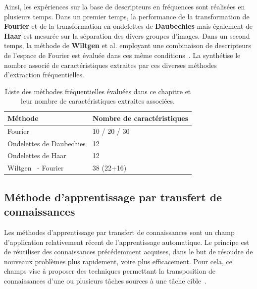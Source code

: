 Ainsi, les expériences sur la base de descripteurs en fréquences sont réalisées en plusieurs temps. Dans un premier temps, la performance de la transformation de \textbf{Fourier} et de la transformation en ondelettes de \textbf{Daubechies} mais également de \textbf{Haar} est mesurée sur la séparation des divers groupes d'images. Dans un second temps, la méthode de \textbf{Wiltgen} et al. employant une combinaison de descripteurs de l'espace de Fourier est évaluée dans ces même conditions~\cite{Wiltgen2008}. La  synthétise le nombre associé de caractéristiques extraites par ces diverses méthodes d'extraction fréquentielles.\par

\begin{table}[H]
    \centering
    \begin{tabular}{ll}
        \toprule
        \textbf{Méthode}                        & \textbf{Nombre de caractéristiques}   \\ \hline
        Fourier                                 & 10 / 20 / 30                          \\ \hline
        Ondelettes de Daubechies                & 12                                    \\ \hline
        Ondelettes de Haar                      & 12                                    \\ \hline
        Wiltgen~\cite{Wiltgen2008} - Fourier    & 38 (22+16)                             \\
        \bottomrule
    \end{tabular}
    \caption{Liste des méthodes fréquentielles évaluées dans ce chapitre et leur nombre de caractéristiques extraites associées.}
    \label{tab:number_features_frequency}
\end{table}\par
\clearpage

\subsection{Méthode d'apprentissage par transfert de connaissances}
Les méthodes d'apprentissage par transfert de connaissances sont un champ d'application relativement récent de l'apprentissage automatique. Le principe est de réutiliser des connaissances précédemment acquises, dans le but de résoudre de nouveaux problèmes plus rapidement, voire plus efficacement. Pour cela, ce champs vise à proposer des techniques permettant la transposition de connaissances d'une ou plusieurs tâches sources à une tâche cible~\cite{QiangYang2010}.\par

